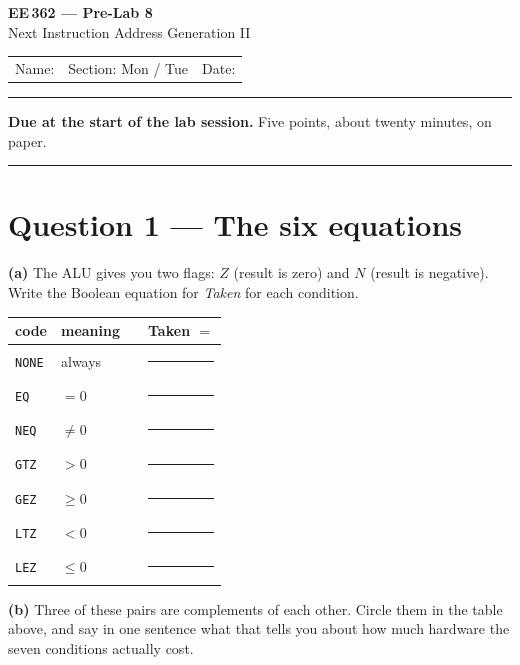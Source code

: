 \documentclass[11pt]{article}
\newcommand{\code}[1]{\texttt{#1}}
\begin{document}
\begin{center}
{\Large\bfseries EE\,362 --- Pre-Lab 8}\\[2pt]
{\large Next Instruction Address Generation II}\\[6pt]
\begin{tabular}{@{}p{6.5cm}p{4cm}p{4cm}@{}}
Name: \hrulefill & Section: Mon / Tue & Date: \hrulefill
\end{tabular}
\end{center}

\vspace{2pt}\hrule\vspace{4pt}

{\small\textbf{Due at the start of the lab session.} Five points, about twenty
minutes, on paper.}

\vspace{4pt}\hrule

\section*{Question 1 --- The six equations}

\textbf{(a)} The ALU gives you two flags: $Z$ (result is zero) and $N$ (result
is negative). Write the Boolean equation for \emph{Taken} for each condition.

\begin{center}
\begin{tabular}{lll@{\hskip 8pt}||@{\hskip 8pt}l}
\toprule
code & meaning & & Taken $=$ \\
\midrule
\code{NONE} & always   & & \rule{5cm}{0.4pt} \\[5pt]
\code{EQ}   & $=0$     & & \rule{5cm}{0.4pt} \\[5pt]
\code{NEQ}  & $\neq 0$ & & \rule{5cm}{0.4pt} \\[5pt]
\code{GTZ}  & $>0$     & & \rule{5cm}{0.4pt} \\[5pt]
\code{GEZ}  & $\geq 0$ & & \rule{5cm}{0.4pt} \\[5pt]
\code{LTZ}  & $<0$     & & \rule{5cm}{0.4pt} \\[5pt]
\code{LEZ}  & $\leq 0$ & & \rule{5cm}{0.4pt} \\
\bottomrule
\end{tabular}
\end{center}

\textbf{(b)} Three of these pairs are complements of each other. Circle them in
the table above, and say in one sentence what that tells you about how much
hardware the seven conditions actually cost.
\end{document}
